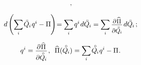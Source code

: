 \begin{otherlanguage}{russian}
\begin{equation*}
\begin{array}{c}
\hspace{.2ex} ,
\\[1em]
%
\small
d \hspace{-0.1ex} \left( \scalebox{0.95}[1]{$\displaystyle \sum_{\smash{i}}$} \hspace{.2ex} \mathcircabove{Q}_{\hspace{-0.1ex}i} \hspace{.2ex} q^i - \potential \hspace{-0.1ex} \right) \hspace{-0.5ex}
= \scalebox{0.95}[1]{$\displaystyle \sum_{\smash{i}}$} \hspace{.32ex} q^i \hspace{.2ex} d\mathcircabove{Q}_{\hspace{-0.1ex}i}
= \scalebox{0.95}[1]{$\displaystyle \sum_{\smash{i}}$} \hspace{.4ex}
\scalebox{0.96}{$ \displaystyle \frac{\raisemath{-0.12em}{\partial \hspace{.1ex} \widehat{\potential}}}{\raisemath{-0.4em}{\partial \mathcircabove{Q}_{\hspace{-0.1ex}i}}} $}
\hspace{.25ex} d\mathcircabove{Q}_{\hspace{-0.1ex}i}
%
\hspace{.33ex} ;
\end{array}\end{equation*}%

\nopagebreak\vspace{-0.33em}\begin{equation}\label{Castigliano:theorem}
q^i = \scalebox{0.96}{$ \displaystyle \frac{\raisemath{-0.12em}{\partial \hspace{.1ex} \widehat{\potential}}}{\raisemath{-0.4em}{\partial \mathcircabove{Q}_{\hspace{-0.1ex}i}}} $} \hspace{.2ex} ,
\:\;
\widehat{\potential}(\mathcircabove{Q}_{\hspace{-0.1ex}i})
= \scalebox{0.95}[1]{$\displaystyle \sum_{\smash{i}}$} \hspace{.2ex} \mathcircabove{Q}_{\hspace{-0.1ex}i} \hspace{.12ex} q^i - \potential
\hspace{.1ex} .
\end{equation}


\end{otherlanguage}
